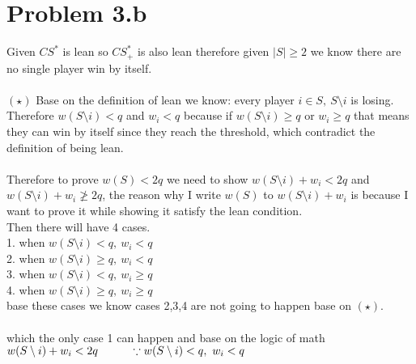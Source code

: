 \documentclass{article}
\newcommand\tab[1][1cm]{\hspace*{#1}}
\begin{document}
\section{Problem 3.b}
Given $CS^*$ is lean so $CS^*_+$ is also lean therefore
given $|S| \geq 2$ we know there are no single player win by itself.\\\\
$(\star)$ Base on the definition of lean we know: every player $i \in S,\ S\setminus i$ is losing. Therefore $w(S \setminus i) < q$ and $w_i < q$ because if $w(S \setminus i) \geq q$ or  $w_i \geq q$ that means they can win by itself since they reach the threshold, which contradict the definition of being lean.\\\\
Therefore to prove $w(S) < 2q$ we need to show $w(S\setminus i) + w_i < 2q$ and $w(S\setminus i) + w_i \not \geq 2q$, the reason why I write $w(S)$ to $w(S\setminus i) + w_i$ is because I want to prove it while showing it satisfy the lean condition. \\
Then there will have 4 cases.\\
1. when $w(S \setminus i) < q,\ w_i < q$\\
2. when $w(S \setminus i) \geq q,\ w_i < q$\\
3. when $w(S \setminus i) < q,\ w_i \geq q$\\
4. when $w(S \setminus i) \geq q,\ w_i \geq q$\\
base these cases we know cases 2,3,4 are not going to happen base on $(\star)$.\\\\
which the only case 1 can happen and base on the logic of math $w(S \setminus i) + w_i < 2q \tab \because w(S \setminus i) < q,\ w_i < q$
\newpage
\end{document}
